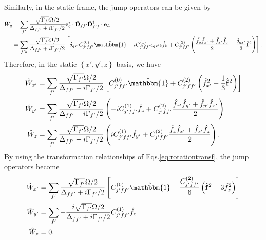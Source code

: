 \documentclass[preprint,aps,pra,onecolumn,superscriptaddress]{revtex4-1} %
\newcommand{\nn}{\nonumber}
\begin{document}
\begin{appendix}
Similarly, in the static frame, the jump operators can be given by
\begin{align}
\hat{W}_q &= \sum_{f'} \frac{\sqrt{\Gamma_{f'}}\Omega/2}{\Delta_{ff'}+i\Gamma_{f'}/2}\mathbf{e}_q^*\cdot \hat{\mathbf{D}}_{ff'} \hat{\mathbf{D}}_{f'f}^\dagger \cdot \mathbf{e}_L \nn \\
&= \sum_{f'k} \frac{\sqrt{\Gamma_{f'}}\Omega/2}{\Delta_{ff'}+i\Gamma_{f'}/2} \left[\delta_{qx'}C_{j'ff'}^{(0)}\hat{\mathbbm{1}} + iC_{j'ff'}^{(1)}\epsilon_{qx'k}\hat{f}_k + C_{j'ff'}^{(2)}\left(\frac{\hat{f}_q\hat{f}_{x'}+\hat{f}_{x'}\hat{f}_q }{2} - \frac{\delta_{qx'}}{3}\hat{\mathbf{f}}^2 \right) \right].
\end{align}
Therefore, in the static $ \left\{x',y',z \right\} $ basis, we have
\begin{align}
\hat{W}_{x'} &= \sum_{f'} \frac{\sqrt{\Gamma_{f'}}\Omega/2}{\Delta_{ff'}+i\Gamma_{f'}/2} \left[C_{j'ff'}^{(0)}\hat{\mathbbm{1}} + C_{j'ff'}^{(2)}\left(\hat{f}_{x'}^2-\frac{1}{3}\hat{\mathbf{f}}^2 \right) \right]\\
\hat{W}_{y'} &= \sum_{f'} \frac{\sqrt{\Gamma_{f'}}\Omega/2}{\Delta_{ff'}+i\Gamma_{f'}/2} \left(-iC_{j'ff'}^{(1)}\hat{f}_z + C_{j'ff'}^{(2)}\frac{\hat{f}_{x'}\hat{f}_{y'}+\hat{f}_{y'}\hat{f}_{x'}}{2} \right)\\
\hat{W}_{z} &= \sum_{f'} \frac{\sqrt{\Gamma_{f'}}\Omega/2}{\Delta_{ff'}+i\Gamma_{f'}/2} \left(iC_{j'ff'}^{(1)}\hat{f}_{y'} + C_{j'ff'}^{(2)}\frac{\hat{f}_z\hat{f}_{x'}+\hat{f}_{x'}\hat{f}_z}{2}  \right).
\end{align}
By using the transformation relationships of Eqs.\eqref{eq:rotationtransf}, the jump operators become 
\begin{subequations}\label{eq:rotationtransf_Wxyz}
\begin{align}
\hat{W}_{x'} &= \sum_{f'} \frac{\sqrt{\Gamma_{f'}}\Omega/2}{\Delta_{ff'}+i\Gamma_{f'}/2} \left[C_{j'ff'}^{(0)}\hat{\mathbbm{1}} + \frac{C_{j'ff'}^{(2)}}{6}\left(\hat{\mathbf{f}}^2-3\hat{f}_{z}^2 \right) \right]\\
\hat{W}_{y'} &= \sum_{f'} -\frac{i\sqrt{\Gamma_{f'}}\Omega/2}{\Delta_{ff'}+i\Gamma_{f'}/2} C_{j'ff'}^{(1)}\hat{f}_z  \\
\hat{W}_{z} &= 0.
\end{align}
\end{subequations}


\end{appendix}
\end{document}
